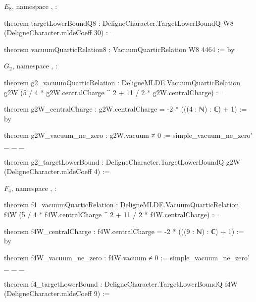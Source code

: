 \noindent$E_8$, namespace , :
\begin{leancode}
theorem targetLowerBoundQ8 :
    DeligneCharacter.TargetLowerBoundQ W8 (DeligneCharacter.mldeCoeff 30) :=

theorem vacuumQuarticRelation8 : VacuumQuarticRelation W8 4464 := by
\end{leancode}
\noindent$G_2$, namespace , :
\begin{leancode}
theorem g2_vacuumQuarticRelation :
    DeligneMLDE.VacuumQuarticRelation g2W
      (5 / 4 * g2W.centralCharge ^ 2 + 11 / 2 * g2W.centralCharge) :=

theorem g2W_centralCharge : g2W.centralCharge = -2 * (((4 : ℕ) : ℂ) + 1) := by

theorem g2W_vacuum_ne_zero : g2W.vacuum ≠ 0 := simple_vacuum_ne_zero' _ _ _

theorem g2_targetLowerBound :
    DeligneCharacter.TargetLowerBoundQ g2W (DeligneCharacter.mldeCoeff 4) :=
\end{leancode}
\noindent$F_4$, namespace , :
\begin{leancode}
theorem f4_vacuumQuarticRelation :
    DeligneMLDE.VacuumQuarticRelation f4W
      (5 / 4 * f4W.centralCharge ^ 2 + 11 / 2 * f4W.centralCharge) :=

theorem f4W_centralCharge : f4W.centralCharge = -2 * (((9 : ℕ) : ℂ) + 1) := by

theorem f4W_vacuum_ne_zero : f4W.vacuum ≠ 0 := simple_vacuum_ne_zero' _ _ _

theorem f4_targetLowerBound :
    DeligneCharacter.TargetLowerBoundQ f4W (DeligneCharacter.mldeCoeff 9) :=
\end{leancode}
